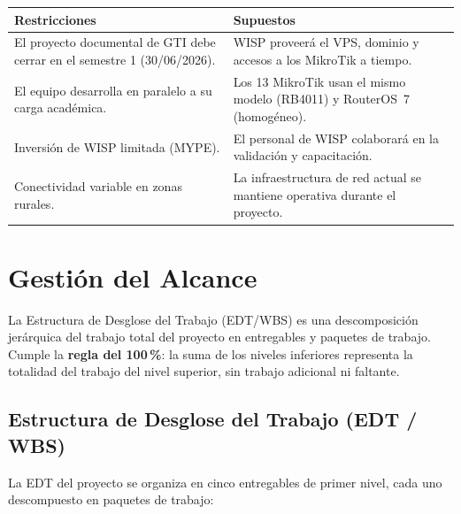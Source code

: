 \begin{center}
\label{tab:restricciones}
\begin{tabularx}{\textwidth}{X X}
\toprule
\textbf{Restricciones} & \textbf{Supuestos} \\
\midrule
El proyecto documental de GTI debe cerrar en el semestre 1 (30/06/2026). &
WISP proveerá el VPS, dominio y accesos a los MikroTik a tiempo. \\
El equipo desarrolla en paralelo a su carga académica. &
Los 13 MikroTik usan el mismo modelo (RB4011) y RouterOS~7 (homogéneo). \\
Inversión de WISP limitada (MYPE). &
El personal de WISP colaborará en la validación y capacitación. \\
Conectividad variable en zonas rurales. &
La infraestructura de red actual se mantiene operativa durante el proyecto. \\
\bottomrule
\end{tabularx}
\end{center}

\section{Gestión del Alcance}
\label{sec:alcance}

La Estructura de Desglose del Trabajo (EDT/WBS) es una descomposición jerárquica del
trabajo total del proyecto en entregables y paquetes de trabajo. Cumple la
\textbf{regla del 100\,\%}: la suma de los niveles inferiores representa la totalidad
del trabajo del nivel superior, sin trabajo adicional ni faltante.

\subsection{Estructura de Desglose del Trabajo (EDT / WBS)}

La EDT del proyecto se organiza en cinco entregables de primer nivel, cada uno
descompuesto en paquetes de trabajo:


